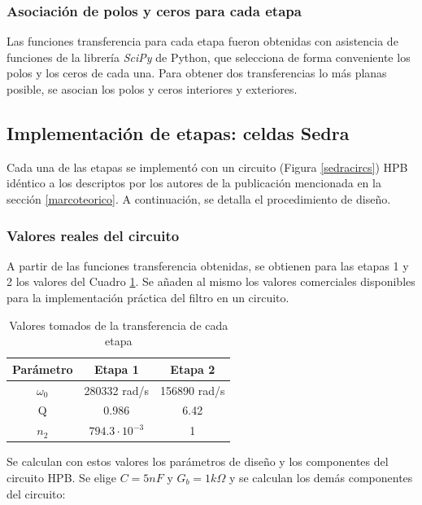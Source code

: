 \subsubsection{Asociación de polos y ceros para cada etapa}
Las funciones transferencia para cada etapa fueron obtenidas con asistencia de funciones de la librería \emph{SciPy} de Python, que selecciona de forma conveniente los polos y los ceros de cada una. Para obtener dos transferencias lo más planas posible, se asocian los polos y ceros interiores y exteriores. %

\subsection{Implementación de etapas: celdas Sedra} 
Cada una de las etapas se implementó con un circuito (Figura \ref{sedracircs}) HPB idéntico a los descriptos por los autores de la publicación mencionada en la sección \ref{marcoteorico}. A continuación, se detalla el procedimiento de diseño.
\subsubsection{Valores reales del circuito}\label{valoresetapassedra}
A partir de las funciones transferencia obtenidas, se obtienen para las etapas 1 y 2 los valores del Cuadro \ref{tablavalorestransferencia}. Se añaden al mismo los valores comerciales disponibles para la implementación práctica del filtro en un circuito.

\begin{table}[H]
\begin{centering}
\begin{tabular}{|c|c|c|}
\hline 
Parámetro & Etapa 1 & Etapa 2\tabularnewline
\hline 
\hline 
$\omega_{0}$ & 280332 rad/s & 156890 rad/s\tabularnewline
\hline 
Q & 0.986 & 6.42\tabularnewline
\hline 
$n_{2}$ & $794.3\cdot10^{-3}$ & 1\tabularnewline
\hline 
\end{tabular}
\par\end{centering}
\caption{Valores tomados de la transferencia de cada etapa}
\label{tablavalorestransferencia}
\end{table}

Se calculan con estos valores los parámetros de diseño y los componentes del circuito HPB. Se elige $C=5nF$ y $G_{b}=1k\Omega$ y se calculan los demás componentes del circuito:

